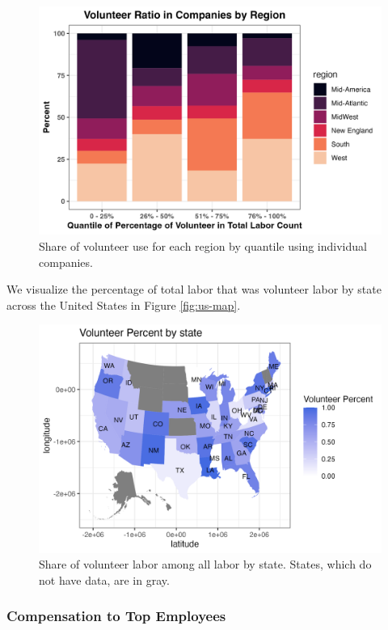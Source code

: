\documentclass[Dance Data
Project,article,submit,moreauthors,pdftex]{mdpi}
\begin{document}
\begin{figure}[H]
\includegraphics[width=0.9\linewidth,]{../images/ratio_bar_region} \caption{\label{fig:ratio-region}Share of volunteer use for each region by quantile using individual companies.}\label{fig:unnamed-chunk-15}
\end{figure}

We visualize the percentage of total labor that was volunteer labor by
state across the United States in Figure \ref{fig:us-map}.

\begin{figure}[H]
\includegraphics[width=0.9\linewidth,]{../images/vol_map} \caption{\label{fig:us-map}Share of volunteer labor among all labor by state. States, which do not have data, are in gray.}\label{fig:unnamed-chunk-16}
\end{figure}

\hypertarget{compensation-to-top-employees}{%
\subsubsection{Compensation to Top
Employees}\label{compensation-to-top-employees}}
\end{document}

